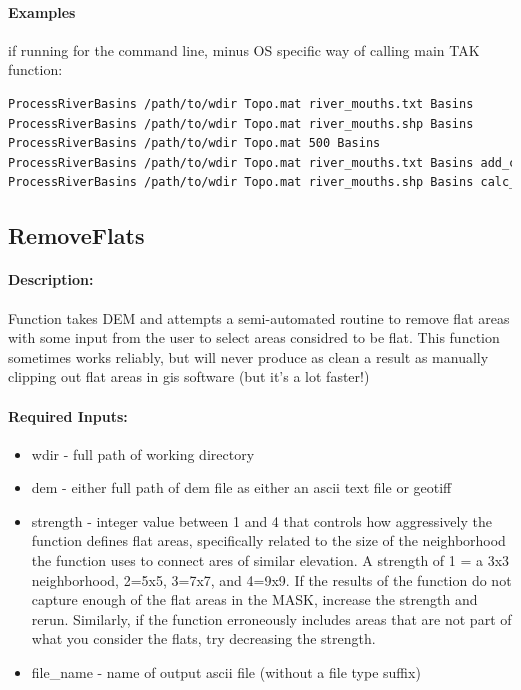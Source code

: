 \paragraph{Examples} if running for the command line, minus OS specific way of calling main TAK function:
\begin{lstlisting}[language=bash]
ProcessRiverBasins /path/to/wdir Topo.mat river_mouths.txt Basins
ProcessRiverBasins /path/to/wdir Topo.mat river_mouths.shp Basins
ProcessRiverBasins /path/to/wdir Topo.mat 500 Basins
ProcessRiverBasins /path/to/wdir Topo.mat river_mouths.txt Basins add_cat_grids AddCatGrids.mat add_grids AddGrids.mat
ProcessRiverBasins /path/to/wdir Topo.mat river_mouths.shp Basins calc_relief true relief_radii [1000 2500 5000]
\end{lstlisting}

\subsection{RemoveFlats}
\paragraph{Description:}		
Function takes DEM and attempts a semi-automated routine to remove flat areas with some input from 
the user to select areas considred to be flat. This function sometimes works reliably, but will 
never produce as clean a result as manually clipping out flat areas in gis software (but it's
a lot faster!)

\paragraph{Required Inputs:}
\begin{itemize}
\item wdir - full path of working directory
\item dem - either full path of dem file as either an ascii text file or geotiff 
\item strength - integer value between 1 and 4 that controls how aggressively the function defines
flat areas, specifically related to the size of the neighborhood the function uses to
connect ares of similar elevation. A strength of 1 = a 3x3 neighborhood, 2=5x5, 3=7x7, and 
4=9x9. If the results of the function do not capture enough of the flat areas in the MASK,
increase the strength and rerun. Similarly, if the function erroneously includes areas that
are not part of what you consider the flats, try decreasing the strength.
\item file\_name - name of output ascii file (without a file type suffix)
\end{itemize}

